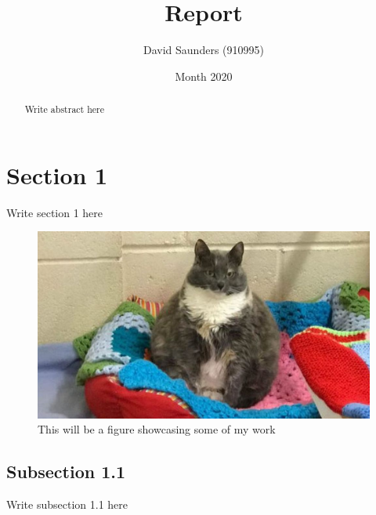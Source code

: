 \documentclass{article}
\title{Report}
\author{David Saunders (910995)}
\date{Month 2020}
\begin{document}
\maketitle

\begin{abstract} 
    Write abstract here
\end{abstract}

\tableofcontents

\section{Section 1}

Write section 1 here \cite{torsney2011tuner}

\begin{figure}[ht]
    \centering
    \includegraphics[scale=0.35]{Test.JPG}
    \caption{This will be a figure showcasing some of my work}
\end{figure}


\subsection{Subsection 1.1}
    Write subsection 1.1 here

\printbibliography
\end{document}

